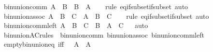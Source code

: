 \begin{isabellebody}
\ bin{\isacharunderscore}{\kern0pt}union{\isacharunderscore}{\kern0pt}comm{\isacharcolon}{\kern0pt}\ {\isachardoublequoteopen}A\ {\isasymunion}\ B\ {\isacharequal}{\kern0pt}\ B\ {\isasymunion}\ A{\isachardoublequoteclose}\isanewline
%
\isadelimproof
\ \ %
\endisadelimproof
%
\isatagproof
{}\isamarkupfalse%
\ {\isacharparenleft}{\kern0pt}rule\ eq{\isacharunderscore}{\kern0pt}if{\isacharunderscore}{\kern0pt}subset{\isacharunderscore}{\kern0pt}if{\isacharunderscore}{\kern0pt}subset{\isacharparenright}{\kern0pt}\ auto%
\endisatagproof
{\isafoldproof}%
%
\isadelimproof
\isanewline
%
\endisadelimproof
\isanewline
{}\isamarkupfalse%
\ bin{\isacharunderscore}{\kern0pt}union{\isacharunderscore}{\kern0pt}assoc{\isacharcolon}{\kern0pt}\ {\isachardoublequoteopen}{\isacharparenleft}{\kern0pt}A\ {\isasymunion}\ B{\isacharparenright}{\kern0pt}\ {\isasymunion}\ C\ {\isacharequal}{\kern0pt}\ A\ {\isasymunion}\ {\isacharparenleft}{\kern0pt}B\ {\isasymunion}\ C{\isacharparenright}{\kern0pt}{\isachardoublequoteclose}\isanewline
%
\isadelimproof
\ \ %
\endisadelimproof
%
\isatagproof
{}\isamarkupfalse%
\ {\isacharparenleft}{\kern0pt}rule\ eq{\isacharunderscore}{\kern0pt}if{\isacharunderscore}{\kern0pt}subset{\isacharunderscore}{\kern0pt}if{\isacharunderscore}{\kern0pt}subset{\isacharparenright}{\kern0pt}\ auto%
\endisatagproof
{\isafoldproof}%
%
\isadelimproof
\isanewline
%
\endisadelimproof
\isanewline
{}\isamarkupfalse%
\ bin{\isacharunderscore}{\kern0pt}union{\isacharunderscore}{\kern0pt}comm{\isacharunderscore}{\kern0pt}left{\isacharcolon}{\kern0pt}\ {\isachardoublequoteopen}A\ {\isasymunion}\ {\isacharparenleft}{\kern0pt}B\ {\isasymunion}\ C{\isacharparenright}{\kern0pt}\ {\isacharequal}{\kern0pt}\ B\ {\isasymunion}\ {\isacharparenleft}{\kern0pt}A\ {\isasymunion}\ C{\isacharparenright}{\kern0pt}{\isachardoublequoteclose}%
\isadelimproof
\ %
\endisadelimproof
%
\isatagproof
{}\isamarkupfalse%
\ auto%
\endisatagproof
{\isafoldproof}%
%
\isadelimproof
%
\endisadelimproof
\isanewline
\isanewline
{}\isamarkupfalse%
\ bin{\isacharunderscore}{\kern0pt}union{\isacharunderscore}{\kern0pt}AC{\isacharunderscore}{\kern0pt}rules\ {\isacharequal}{\kern0pt}\ bin{\isacharunderscore}{\kern0pt}union{\isacharunderscore}{\kern0pt}comm\ bin{\isacharunderscore}{\kern0pt}union{\isacharunderscore}{\kern0pt}assoc\ bin{\isacharunderscore}{\kern0pt}union{\isacharunderscore}{\kern0pt}comm{\isacharunderscore}{\kern0pt}left\isanewline
\isanewline
{}\isamarkupfalse%
\ empty{\isacharunderscore}{\kern0pt}bin{\isacharunderscore}{\kern0pt}union{\isacharunderscore}{\kern0pt}eq\ {\isacharbrackleft}{\kern0pt}iff{\isacharbrackright}{\kern0pt}{\isacharcolon}{\kern0pt}\ {\isachardoublequoteopen}{\isacharbraceleft}{\kern0pt}{\isacharbraceright}{\kern0pt}\ {\isasymunion}\ A\ {\isacharequal}{\kern0pt}\ A{\isachardoublequoteclose}\isanewline

\end{isabellebody}
